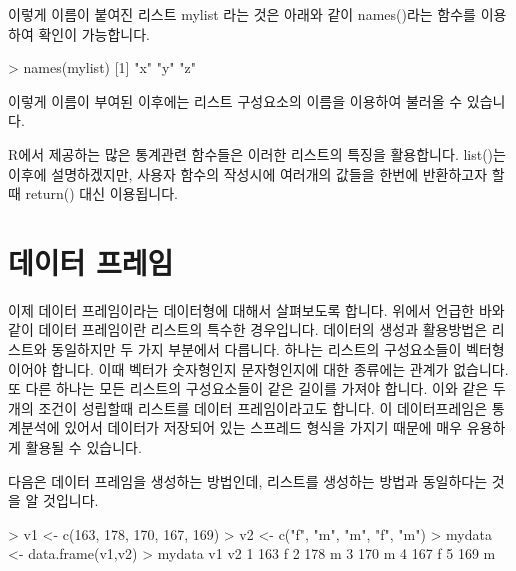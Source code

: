 \documentclass[tutorial.tex]{subfiles}
\begin{document}
이렇게 이름이 붙여진 리스트 mylist 라는 것은 아래와 같이 names()라는 함수를 이용하여 확인이 가능합니다.

\begin{Schunk}
\begin{Soutput}
> names(mylist)
[1] "x" "y" "z"
\end{Soutput}
\end{Schunk}

이렇게 이름이 부여된 이후에는 리스트 구성요소의 이름을 이용하여 불러올 수 있습니다.

\begin{Schunk}
\end{Schunk}

R에서 제공하는 많은 통계관련 함수들은 이러한 리스트의 특징을 활용합니다.
list()는 이후에 설명하겠지만, 사용자 함수의 작성시에 여러개의 값들을 한번에 반환하고자 할때 return() 대신 이용됩니다.

\section{데이터 프레임}

이제 데이터 프레임이라는 데이터형에 대해서 살펴보도록 합니다.
위에서 언급한 바와 같이 데이터 프레임이란 리스트의 특수한 경우입니다.
데이터의 생성과 활용방법은 리스트와 동일하지만 두 가지 부분에서 다릅니다.
하나는 리스트의 구성요소들이 벡터형이어야 합니다. 
이때 벡터가 숫자형인지 문자형인지에 대한 종류에는 관계가 없습니다.
또 다른 하나는 모든 리스트의 구성요소들이 같은 길이를 가져야 합니다.
이와 같은 두개의 조건이 성립할때 리스트를 데이터 프레임이라고도 합니다.
이 데이터프레임은 통계분석에 있어서 데이터가 저장되어 있는 스프레드 형식을 가지기 때문에 매우 유용하게 활용될 수 있습니다.


다음은 데이터 프레임을 생성하는 방법인데, 리스트를 생성하는 방법과 동일하다는 것을 알 것입니다.
\begin{Schunk}
\begin{Soutput}
> v1 <- c(163, 178, 170, 167, 169)
> v2 <- c("f", "m", "m", "f", "m")
> mydata <- data.frame(v1,v2)
> mydata
   v1 v2
1 163  f
2 178  m
3 170  m
4 167  f
5 169  m
\end{Soutput}
\end{Schunk}
\end{document}

